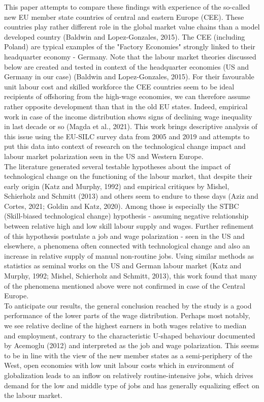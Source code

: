 \documentclass{article}
\begin{document}
This paper attempts to compare these findings with experience of the so-called new EU member state countries of central and eastern Europe (CEE). These countries play rather different role in the global market value chains than a model developed country (Baldwin and Lopez-Gonzales, 2015). The CEE (including Poland) are typical examples of the "Factory Economies" strongly linked to their headquarter economy - Germany. Note that the labour market theories discussed below are created and tested in context of the headquarter economies (US and Germany in our case) (Baldwin and Lopez-Gonzales, 2015). 
For their favourable unit labour cost and skilled workforce the CEE countries seem to be ideal recipients of offshoring from the high-wage economies, we can therefore assume rather opposite development than that in the old EU states. Indeed, empirical work in case of the income distribution shows signs of declining wage inequality in last decade or so (Magda et al., 2021). This work brings descriptive analysis of this issue using the EU-SILC survey data from 2005 and 2019 and attempts to put this data into context of research on the technological change impact and labour market polarization seen in the US and Western Europe.
\\
The literature generated several testable hypotheses about the impact of technological change on the functioning of the labour market, that despite their early origin (Katz and Murphy, 1992) and empirical critiques by Mishel, Schierholz and Schmitt (2013) and others seem to endure to these days (Aziz and Cortes, 2021; Goldin and Katz, 2020). Among those is especially the STBC (Skill-biased technological change) hypothesis - assuming negative relationship between relative high and low skill labour supply and wages. Further refinement of this hypothesis postulate a job and wage polarization - seen in the US and elsewhere, a phenomena often connected with technological change and also an increase in relative supply of manual non-routine jobs. Using similar methods as statistics as seminal works on the US and German labour market (Katz and Murphy, 1992; Mishel, Schierholz and Schmitt, 2013), this work found that many of the phenomena mentioned above were not confirmed in case of the Central Europe. 
\\
To anticipate our results, the general conclusion reached by the study is a good performance of the lower parts of the wage distribution. Perhaps most notably, we see relative decline of the highest earners in both wages relative to median and employment, contrary to the characteristic U-shaped behaviour documented by Acemoglu (2012) and interpreted as the job and wage polarization. This seems to be in line with the view of the new member states as a semi-periphery of the West, open economies with low unit labour costs which in environment of globalization leads to an inflow on relatively routine-intensive jobs, which drives demand for the low and middle type of jobs and has generally equalizing effect on the labour market. 
\end{document}
